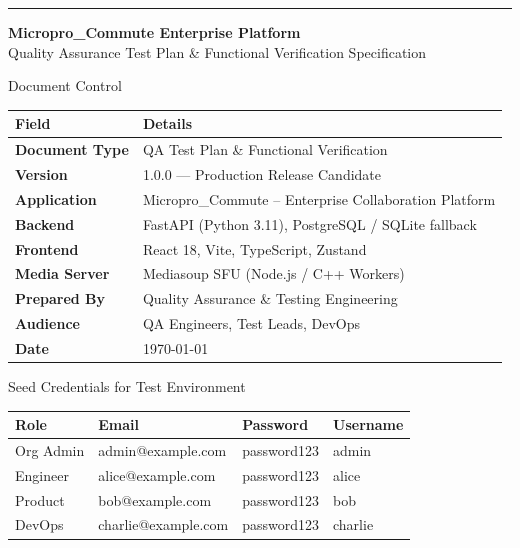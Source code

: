 \documentclass[11pt,a4paper]{report}
\begin{document}

\begin{titlepage}
\centering\vspace*{1.5cm}
{\color{navy}\rule{\textwidth}{2pt}}\vspace{0.7cm}

{\LARGE\bfseries Micropro\_Commute Enterprise Platform}\\\vspace{0.3cm}
{\large Quality Assurance Test Plan \& Functional Verification Specification}

\vspace{0.5cm}{\color{navy}\rule{\textwidth}{2pt}}\vspace{1.5cm}

\begin{notebox}{Document Control}
\begin{tabularx}{\textwidth}{|L{3.5cm}|X|}
\hline
{} \textbf{Field} & \textbf{Details} \\ \hline
\textbf{Document Type}  & QA Test Plan \& Functional Verification \\ \hline
\textbf{Version}        & 1.0.0 --- Production Release Candidate \\ \hline
\textbf{Application}    & Micropro\_Commute -- Enterprise Collaboration Platform \\ \hline
\textbf{Backend}        & FastAPI (Python 3.11), PostgreSQL / SQLite fallback \\ \hline
\textbf{Frontend}       & React 18, Vite, TypeScript, Zustand \\ \hline
\textbf{Media Server}   & Mediasoup SFU (Node.js / C++ Workers) \\ \hline
\textbf{Prepared By}    & Quality Assurance \& Testing Engineering \\ \hline
\textbf{Audience}       & QA Engineers, Test Leads, DevOps \\ \hline
\textbf{Date}           & \today \\ \hline
\end{tabularx}
\end{notebox}

\vspace{1cm}

\begin{notebox}{Seed Credentials for Test Environment}
\begin{tabularx}{\textwidth}{|L{2.5cm}|X|L{3cm}|L{2.5cm}|}
\hline
{} \textbf{Role} & \textbf{Email} & \textbf{Password} & \textbf{Username}\\ \hline
Org Admin     & admin@example.com  & password123 & admin   \\ \hline
Engineer      & alice@example.com  & password123 & alice   \\ \hline
Product       & bob@example.com    & password123 & bob     \\ \hline
DevOps        & charlie@example.com& password123 & charlie \\ \hline
\end{tabularx}
\end{notebox}


\end{titlepage}
\end{document}
